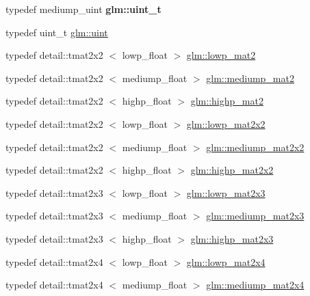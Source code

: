 \begin{DoxyCompactItemize}
\item 
\hypertarget{group__core__precision_ga5f2ae871c284c9d39ae8fdbb1305b566}{typedef mediump\-\_\-uint {\bfseries glm\-::uint\-\_\-t}}\label{group__core__precision_ga5f2ae871c284c9d39ae8fdbb1305b566}

\item 
typedef uint\-\_\-t \hyperlink{group__core__precision_ga483f6011e60602f0b73bfd0acad0f04c}{glm\-::uint}
\item 
typedef detail\-::tmat2x2\*
$<$ lowp\-\_\-float $>$ \hyperlink{group__core__precision_ga403348153f5cd7bd52598be409afdf47}{glm\-::lowp\-\_\-mat2}
\item 
typedef detail\-::tmat2x2\*
$<$ mediump\-\_\-float $>$ \hyperlink{group__core__precision_gae67a4f24fb96b68e0f0346ef4212db61}{glm\-::mediump\-\_\-mat2}
\item 
typedef detail\-::tmat2x2\*
$<$ highp\-\_\-float $>$ \hyperlink{group__core__precision_ga6652bb577f74f322220305a985a8c200}{glm\-::highp\-\_\-mat2}
\item 
typedef detail\-::tmat2x2\*
$<$ lowp\-\_\-float $>$ \hyperlink{group__core__precision_gae3f6c672d0fa47ece879f2b1cda7f22b}{glm\-::lowp\-\_\-mat2x2}
\item 
typedef detail\-::tmat2x2\*
$<$ mediump\-\_\-float $>$ \hyperlink{group__core__precision_gaa78fd2384931c244700851141b8a47eb}{glm\-::mediump\-\_\-mat2x2}
\item 
typedef detail\-::tmat2x2\*
$<$ highp\-\_\-float $>$ \hyperlink{group__core__precision_gadc6208de252d8c5d4afd1a3518370db3}{glm\-::highp\-\_\-mat2x2}
\item 
typedef detail\-::tmat2x3\*
$<$ lowp\-\_\-float $>$ \hyperlink{group__core__precision_ga094f5266f214da7ef32e49df6432f4fa}{glm\-::lowp\-\_\-mat2x3}
\item 
typedef detail\-::tmat2x3\*
$<$ mediump\-\_\-float $>$ \hyperlink{group__core__precision_gac44c7deb23abed76330948e10d919bcc}{glm\-::mediump\-\_\-mat2x3}
\item 
typedef detail\-::tmat2x3\*
$<$ highp\-\_\-float $>$ \hyperlink{group__core__precision_ga89136b699656886b0941c95cf2778da3}{glm\-::highp\-\_\-mat2x3}
\item 
typedef detail\-::tmat2x4\*
$<$ lowp\-\_\-float $>$ \hyperlink{group__core__precision_ga800238e68eee3279c7a38d4f3cd005e8}{glm\-::lowp\-\_\-mat2x4}
\item 
typedef detail\-::tmat2x4\*
$<$ mediump\-\_\-float $>$ \hyperlink{group__core__precision_ga2e80caa3f70e504bd574664b1029e627}{glm\-::mediump\-\_\-mat2x4}
\item 

\end{DoxyCompactItemize}

